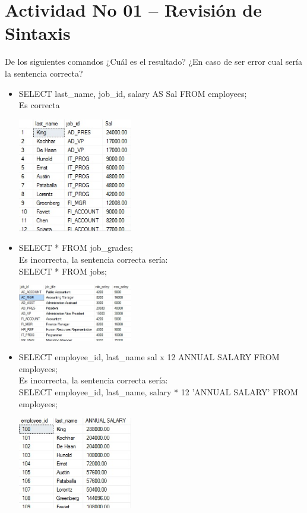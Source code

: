 \section{Actividad No 01 – Revisi\'on de Sintaxis} 
De los siguientes comandos ¿Cuál es el resultado? ¿En caso de ser error cual sería la sentencia correcta?

\begin{itemize}
	\item SELECT last\_name, job\_id, salary AS Sal FROM employees;
	\\Es correcta
	\begin{center}
	\includegraphics[width=5cm]{./Imagenes/actividad0101} 
	\end{center}

	\item SELECT * FROM job\_grades;
	\\Es incorrecta, la sentencia correcta sería:
	\\SELECT * FROM jobs;
	\begin{center}
	\includegraphics[width=5cm]{./Imagenes/actividad0102} 
	\end{center}
	
	\item SELECT employee\_id, last\_name sal x 12 ANNUAL SALARY FROM employees;
	\\Es incorrecta, la sentencia correcta sería:
	\\SELECT employee\_id, last\_name, salary * 12 'ANNUAL SALARY' FROM employees;
	\begin{center}
	\includegraphics[width=5cm]{./Imagenes/actividad0103} 
	\end{center}

\end{itemize} 
